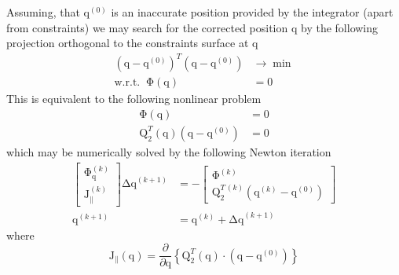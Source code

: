 \documentclass{scrartcl}
\newcommand\mMat[1]{\ensuremath{\boldsymbol{\mathrm{#1}}}}
\newcommand\mVec[1]{\ensuremath{\boldsymbol{\mathrm{#1}}}}
\newcommand\mOf[1]{\left({#1}\right)}
\begin{document}
Assuming, that $\mVec{q}^{(0)}$ is an inaccurate position provided by the
integrator (apart from constraints) we may search for the corrected position
$\mVec{q}$ by the following projection orthogonal to the constraints surface at
$\mVec{q}$
\begin{subequations}
\begin{align}
  (\mVec{q} - \mVec{q}^{(0)})^{T} (\mVec{q} - \mVec{q}^{(0)})
    & \rightarrow \min
  \\
  \text{w.r.t.}\;\;\mVec{\Phi}\mOf{\mVec{q}}
    & = \mVec{0}
\end{align}
\end{subequations}
This is equivalent to the following nonlinear problem
\begin{subequations}
\begin{align}
  \mVec{\Phi}\mOf{\mVec{q}} & = \mVec{0}
  \\
  \mMat{Q}_2^T\mOf{\mVec{q}}(\mVec{q} - \mVec{q}^{(0)}) &= \mVec{0}
\end{align}
\end{subequations}
which may be numerically solved by the following Newton iteration
\begin{subequations}
\begin{align}
  \begin{bmatrix}
    \mMat{\Phi}_{\mVec{q}}^{(k)} \\
    \mMat{J}_{\parallel}^{(k)}
  \end{bmatrix}
  \mVec{\Delta q}^{(k+1)}
  & = - \begin{bmatrix}
    \mVec{\Phi}^{(k)} \\
    \mMat{Q}_2^{T\,(k)} \left(\mVec{q}^{(k)} - \mVec{q}^{(0)}\right)
  \end{bmatrix}
  \\
  \mVec{q}^{(k+1)} &= \mVec{q}^{(k)} + \mVec{\Delta q}^{(k+1)}
\end{align}
\end{subequations}
where
\begin{equation}
  \mMat{J}_{\parallel}\mOf{\mVec{q}} = \frac{\partial}{\partial \mVec{q}}\left\{
    \mMat{Q}_2^{T}\mOf{\mVec{q}} \cdot \left(\mVec{q} - \mVec{q}^{(0)}\right)
  \right\}
\end{equation}
\end{document}
